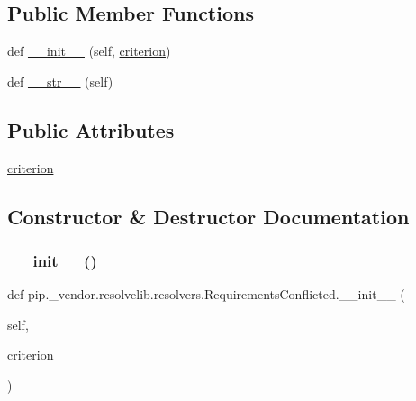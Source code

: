 \subsection*{Public Member Functions}
\begin{DoxyCompactItemize}
\item 
def \hyperlink{classpip_1_1__vendor_1_1resolvelib_1_1resolvers_1_1RequirementsConflicted_a0bd4fb6d8797848144da4b380d44c6af}{\+\_\+\+\_\+init\+\_\+\+\_\+} (self, \hyperlink{classpip_1_1__vendor_1_1resolvelib_1_1resolvers_1_1RequirementsConflicted_a247bc5351aef057db6f97572597c7a78}{criterion})
\item 
def \hyperlink{classpip_1_1__vendor_1_1resolvelib_1_1resolvers_1_1RequirementsConflicted_a43f5e2dc21ad898d8e8c0de35fcd407a}{\+\_\+\+\_\+str\+\_\+\+\_\+} (self)
\end{DoxyCompactItemize}
\subsection*{Public Attributes}
\begin{DoxyCompactItemize}
\item 
\hyperlink{classpip_1_1__vendor_1_1resolvelib_1_1resolvers_1_1RequirementsConflicted_a247bc5351aef057db6f97572597c7a78}{criterion}
\end{DoxyCompactItemize}


\subsection{Constructor \& Destructor Documentation}
\mbox{\label{classpip_1_1__vendor_1_1resolvelib_1_1resolvers_1_1RequirementsConflicted_a0bd4fb6d8797848144da4b380d44c6af}} 
\subsubsection{\texorpdfstring{\+\_\+\+\_\+init\+\_\+\+\_\+()}{\_\_init\_\_()}}
{\footnotesize\ttfamily def pip.\+\_\+vendor.\+resolvelib.\+resolvers.\+Requirements\+Conflicted.\+\_\+\+\_\+init\+\_\+\+\_\+ (\begin{DoxyParamCaption}\item[{}]{self,  }\item[{}]{criterion }\end{DoxyParamCaption})}



